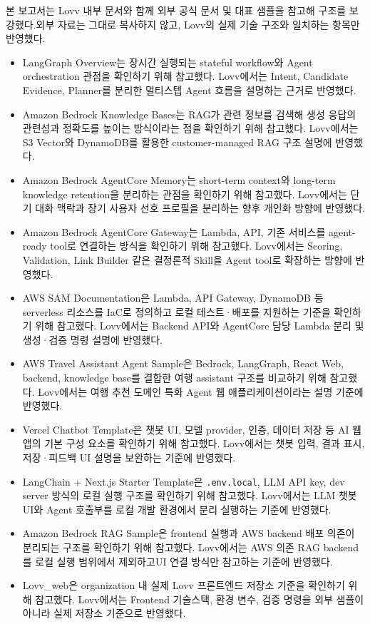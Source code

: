 \documentclass[12pt,a4paper]{article}
\newcommand{\DocNeedspace}[1]{\par\ifdim\dimexpr\pagegoal-\pagetotal\relax<#1\newpage\fi}
\begin{document}
\DocNeedspace{3\baselineskip}
본 보고서는 Lovv 내부 문서와 함께 외부 공식 문서 및 대표 샘플을 참고해 구조를 보강했다.\newline 외부 자료는 그대로 복사하지 않고, Lovv의 실제 기술 구조와 일치하는 항목만 반영했다.


\begin{itemize}
\item LangGraph Overview는 장시간 실행되는 stateful workflow와 Agent orchestration 관점을 확인하기 위해 참고했다. Lovv에서는 Intent, Candidate Evidence, Planner를 분리한 멀티스텝 Agent 흐름을 설명하는 근거로 반영했다.
\item Amazon Bedrock Knowledge Bases는 RAG가 관련 정보를 검색해 생성 응답의 관련성과 정확도를 높이는 방식이라는 점을 확인하기 위해 참고했다. Lovv에서는 S3 Vector와 DynamoDB를 활용한 customer-managed RAG 구조 설명에 반영했다.
\item Amazon Bedrock AgentCore Memory는 short-term context와 long-term knowledge retention을 분리하는 관점을 확인하기 위해 참고했다. Lovv에서는 단기 대화 맥락과 장기 사용자 선호 프로필을 분리하는 향후 개인화 방향에 반영했다.
\item Amazon Bedrock AgentCore Gateway는 Lambda, API, 기존 서비스를 agent-ready tool로 연결하는 방식을 확인하기 위해 참고했다. Lovv에서는 Scoring, Validation, Link Builder 같은 결정론적 Skill을 Agent tool로 확장하는 방향에 반영했다.
\item AWS SAM Documentation은 Lambda, API Gateway, DynamoDB 등 serverless 리소스를 IaC로 정의하고 로컬 테스트·배포를 지원하는 기준을 확인하기 위해 참고했다. Lovv에서는 Backend API와 AgentCore 담당 Lambda 분리 및 생성·검증 명령 설명에 반영했다.
\item AWS Travel Assistant Agent Sample은 Bedrock, LangGraph, React Web, backend, knowledge base를 결합한 여행 assistant 구조를 비교하기 위해 참고했다. Lovv에서는 여행 추천 도메인 특화 Agent 웹 애플리케이션이라는 설명 기준에 반영했다.
\item Vercel Chatbot Template은 챗봇 UI, 모델 provider, 인증, 데이터 저장 등 AI 웹 앱의 기본 구성 요소를 확인하기 위해 참고했다. Lovv에서는 챗봇 입력, 결과 표시, 저장·피드백 UI 설명을 보완하는 기준에 반영했다.
\item LangChain + Next.js Starter Template은 \texttt{.\allowbreak{}env.\allowbreak{}local}, LLM API key, dev server 방식의 로컬 실행 구조를 확인하기 위해 참고했다. Lovv에서는 LLM 챗봇 UI와 Agent 호출부를 로컬 개발 환경에서 분리 실행하는 기준에 반영했다.
\item Amazon Bedrock RAG Sample은 frontend 실행과 AWS backend 배포 의존이 분리되는 구조를 확인하기 위해 참고했다. Lovv에서는 AWS 의존 RAG backend를 로컬 실행 범위에서 제외하고\newline UI 연결 방식만 참고하는 기준에 반영했다.
\item Lovv\_web은 organization 내 실제 Lovv 프론트엔드 저장소 기준을 확인하기 위해 참고했다. Lovv에서는 Frontend 기술스택, 환경 변수, 검증 명령을 외부 샘플이 아니라 실제 저장소 기준으로 반영했다.
\end{itemize}
\end{document}
